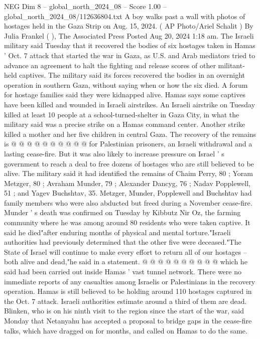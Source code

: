 \begin{textsample}{NEG Dim 8 – global\_north\_2024\_08 – Score 1.00 – global\_north\_2024\_08/112636804.txt}  \label{ex:f8_neg_428}
A boy walks past a wall with photos of hostages held in the Gaza Strip on Aug. 15, 2024. ( AP Photo/Ariel Schalit ) By Julia Frankel ( ), The Associated Press Posted Aug 20, 2024 1:18 am.
The Israeli military said Tuesday that it recovered the bodies of six hostages taken in Hamas ' Oct. 7 attack that started the war in Gaza, as U.S. and Arab mediators tried to advance an agreement to halt the fighting and release scores of other militant-held captives.
The military said its forces recovered the bodies in an overnight operation in southern Gaza, without saying when or how the six died.
A forum for hostage families said they were kidnapped alive.
Hamas says some captives have been killed and wounded in Israeli airstrikes.
An Israeli airstrike on Tuesday killed at least 10 people at a school-turned-shelter in Gaza City, in what the military said was a precise strike on a Hamas command center.
Another strike killed a mother and her five children in central Gaza.
The recovery of the remains is @ @ @ @ @ @ @ @ @ @ for Palestinian prisoners, an Israeli withdrawal and a lasting cease-fire.
But it was also likely to increase pressure on Israel ' s government to reach a deal to free dozens of hostages who are still believed to be alive.
The military said it had identified the remains of Chaim Perry, 80 ; Yoram Metzger, 80 ; Avraham Munder, 79 ; Alexander Dancyg, 76 ; Nadav Popplewell, 51 ; and Yagev Buchshtav, 35.
Metzger, Munder, Popplewell and Buchshtav had family members who were also abducted but freed during a November cease-fire.
Munder ' s death was confirmed on Tuesday by Kibbutz Nir Oz, the farming community where he was among around 80 residents who were taken captive.
It said he died"after enduring months of physical and mental torture."Israeli authorities had previously determined that the other five were deceased."The State of Israel will continue to make every effort to return all of our hostages -- both alive and dead,"he said in a statement. @ @ @ @ @ @ @ @ @ @ which he said had been carried out inside Hamas ' vast tunnel network.
There were no immediate reports of any casualties among Israelis or Palestinians in the recovery operation.
Hamas is still believed to be holding around 110 hostages captured in the Oct. 7 attack.
Israeli authorities estimate around a third of them are dead.
Blinken, who is on his ninth visit to the region since the start of the war, said Monday that Netanyahu has accepted a proposal to bridge gaps in the cease-fire talks, which have dragged on for months, and called on Hamas to do the same.

\end{textsample}
